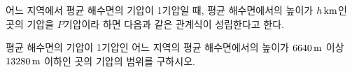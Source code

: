 어느 지역에서 평균 해수면의 기압이 1기압일 때, 평균 해수면에서의 높이가 $h\mkern3mu \mathrm{km}$인 곳의 기압을 $P$기압이라 하면 다음과 같은 관계식이 성립한다고 한다.\par\smallskip{}\par\smallskip\noindent 평균 해수면의 기압이 1기압인 어느 지역의 평균 해수면에서의 높이가 $6640\mkern3mu \mathrm{m}$ 이상 $13280\mkern3mu \mathrm{m}$ 이하인 곳의 기압의 범위를 구하시오.
